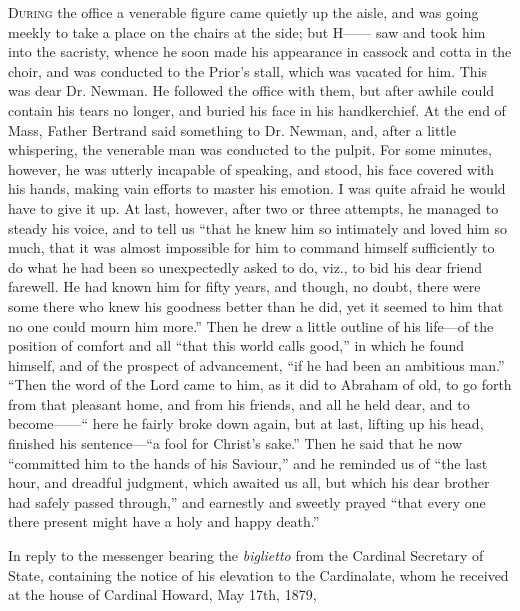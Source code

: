D\textsc{uring} the office a
venerable figure came quietly up the aisle, and was going meekly to
take a place on the chairs at the side; but H—— saw and took him
into the sacristy, whence he soon made his appearance in cassock and
cotta in the choir, and was conducted to the Prior's stall, which was
vacated for him. This was dear Dr. Newman. He followed the office with
them, but after awhile could contain his tears no longer, and buried
his face in his handkerchief. At the end of Mass, Father Bertrand said
something to Dr. Newman, and, after a little whispering, the venerable
man was conducted to the pulpit. For some minutes, however, he was
utterly incapable of speaking, and stood, his face covered with
his hands, making vain efforts to master his emotion. I was quite
afraid he would have to give it up. At last, however, after two or
three attempts, he managed to steady his voice, and to tell us ``that
he knew him so intimately and loved him so much, that it was almost
impossible for him to command himself sufficiently to do what he had
been so unexpectedly asked to do, viz., to bid his dear friend
farewell. He had known him for fifty years, and though, no doubt,
there were some there who knew his goodness better than he did, yet it
seemed to him that no one could mourn him more.'' Then he drew a little
outline of his life—of the position of comfort and all ``that this
world calls good,'' in which he found himself, and of the prospect of
advancement, ``if he had been an ambitious man.'' ``Then the word of the
Lord came to him, as it did to Abraham of old, to go forth from that
pleasant home, and from his friends, and all he held dear, and to
become——`` here he fairly broke down again, but at last, lifting up
his head, finished his sentence—``a fool for Christ's sake.'' Then he
said that he now ``committed him to the hands of his Saviour,'' and he
reminded us of ``the last hour, and dreadful judgment, which awaited us
all, but which his dear brother had safely passed through,'' and
earnestly and sweetly prayed ``that every one there present might have
a holy and happy death.''


In reply to the messenger bearing the \emph{biglietto}
from the Cardinal Secretary of State, containing the notice of his
elevation to the Cardinalate, whom he received at the house of
Cardinal Howard, May 17th, 1879,

